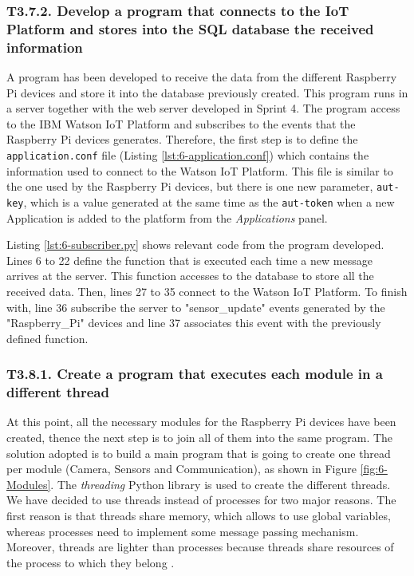 \subsubsection{T3.7.2. Develop a program that connects to the IoT Platform and stores into the SQL database the received information}

A program has been developed to receive the data from the different Raspberry Pi devices and store it into the database previously created. This program runs in a server together with the web server developed in Sprint 4. The program access to the IBM Watson IoT Platform and subscribes to the events that the Raspberry Pi devices generates. Therefore, the first step is to define the \texttt{application.conf} file (Listing \ref{lst:6-application.conf}) which contains the information used to connect to the Watson IoT Platform. This file is similar to the one used by the Raspberry Pi devices, but there is one new parameter, \texttt{aut-key}, which is a value generated at the same time as the \texttt{aut-token} when a new Application is added to the platform from the \textit{Applications} panel.

 


Listing \ref{lst:6-subscriber.py} shows relevant code from the program developed. Lines 6 to 22 define the function that is executed each time a new message arrives at the server. This function accesses to the database to store all the received data. Then, lines 27 to 35 connect to the Watson IoT Platform. To finish with, line 36 subscribe the server to "sensor\_update" events generated by the "Raspberry\_Pi" devices and line 37 associates this event with the previously defined function.




\subsubsection{T3.8.1. Create a program that executes each module in a different thread}

At this point, all the necessary modules for the Raspberry Pi devices have been created,  thence the next step is to join all of them into the same program. The solution adopted is to build a main program that is going to create one thread per module (Camera, Sensors and Communication), as shown in Figure \ref{fig:6-Modules}. The \textit{threading} Python library is used to create the different threads. We have decided to use threads instead of processes for two major reasons. The first reason is that threads share memory, which allows to use global variables, whereas processes need to implement some message passing mechanism. Moreover, threads are lighter than processes because threads share resources of the process to which they belong \cite{SGG06}.

